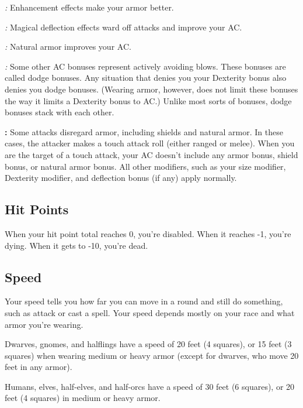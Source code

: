 \textit{:} Enhancement effects make your armor better.

\textit{:} Magical deflection effects ward off attacks and improve your AC.

\textit{:} Natural armor improves your AC.

\textit{:} Some other AC bonuses represent actively avoiding blows. 
These bonuses are called dodge bonuses. Any situation that denies you your Dexterity 
bonus also denies you dodge bonuses. (Wearing armor, however, does not limit these 
bonuses the way it limits a Dexterity bonus to AC.) Unlike most sorts of bonuses, 
dodge bonuses stack with each other.

\textbf{:} Some attacks disregard armor, including shields and natural 
armor. In these cases, the attacker makes a touch attack roll (either ranged or 
melee). When you are the target of a touch attack, your AC doesn't include any 
armor bonus, shield bonus, or natural armor bonus. All other modifiers, such as 
your size modifier, Dexterity modifier, and deflection bonus (if any) apply normally.

\subsection{Hit Points}

When your hit point total reaches 0, you're disabled. When it reaches -1, you're 
dying. When it gets to -10, you're dead.

\subsection{Speed}

Your speed tells you how far you can move in a round and still do something, such 
as attack or cast a spell. Your speed depends mostly on your race and what armor 
you're wearing.

Dwarves, gnomes, and halflings have a speed of 20 feet (4 squares), or 15 feet 
(3 squares) when wearing medium or heavy armor (except for dwarves, who move 20 
feet in any armor).

Humans, elves, half-elves, and half-orcs have a speed of 30 feet (6 squares), or 
20 feet (4 squares) in medium or heavy armor.


